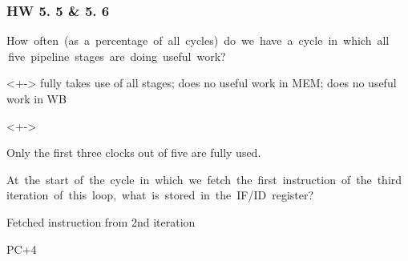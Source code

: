 \documentclass[xcolor=table]{beamer}
\begin{document}
\begin{mdframe}%

\frametitle{HW 5. 5 \& 5. 6}\label{heading-sec-hw-5-5-5-6}%

\noindent{} How  often  (as  a  percentage  of  all  cycles)  do  we  have  a  cycle  in  which  all  five  pipeline  stages  are  doing  useful  work?%

\mdhr{}%

\begin{onlyenv}<+->%
\noindent{} fully takes use of all stages;  does no useful work in MEM;  does no useful work in WB%
\end{onlyenv}%

\begin{onlyenv}<+->%
\begin{mdbmargintb}{}{}%
Only the first three clocks out of five are fully used.%
\end{mdbmargintb}%
\end{onlyenv}%

 At  the  start  of  the  cycle  in  which  we  fetch  the  first  instruction  of  the  third  iteration  of  this  loop,  what  is  stored  in  the  IF/ID  register?%

\mdhr{}%

\begin{itemize}[noitemsep,topsep=\mdcompacttopsep]%
\begin{mdfragmented}%

\item{}Fetched instruction from 2nd iteration %

\item{}PC+4%
\end{mdfragmented}%
\end{itemize}%
\end{mdframe}\label{sec-hw-5-5-5-6}%
\end{document}
